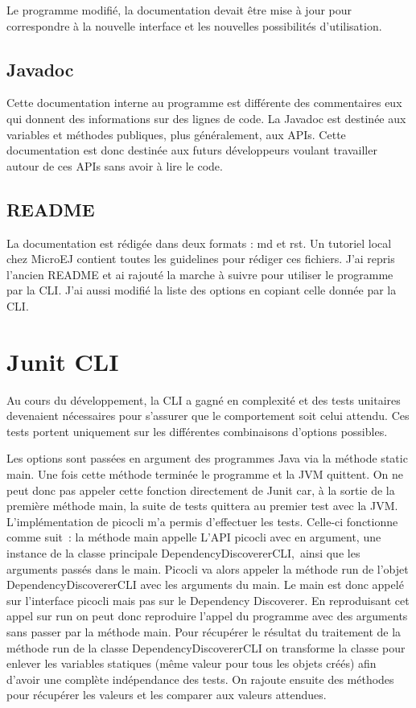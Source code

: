 \documentclass[french,a4paper,12pt]{report}
\begin{document}
Le programme modifié, la documentation devait être mise à jour pour correspondre à la nouvelle interface et les nouvelles possibilités d’utilisation.


\subsection{Javadoc}

Cette documentation interne au programme est différente des commentaires eux qui donnent des informations sur des lignes de code. La Javadoc est destinée aux variables et méthodes publiques, plus généralement, aux APIs. Cette documentation est donc destinée aux futurs développeurs voulant travailler autour de ces APIs sans avoir à lire le code.

\subsection{README}

La documentation est rédigée dans deux formats : md et rst. Un tutoriel local chez MicroEJ contient toutes les guidelines pour rédiger ces fichiers. J'ai repris l'ancien README et ai rajouté la marche à suivre pour utiliser le programme par la CLI. J'ai aussi modifié la liste des options en copiant celle donnée par la CLI. 

\section{Junit CLI}

Au cours du développement, la CLI a gagné en complexité et des tests unitaires devenaient nécessaires pour s’assurer que le comportement soit celui attendu. Ces tests portent uniquement sur les différentes combinaisons d’options possibles. 

Les options sont passées en argument des programmes Java via la méthode static main. Une fois cette méthode terminée le programme et la JVM quittent. On ne peut donc pas appeler cette fonction directement de Junit car, à la sortie de la première méthode main, la suite de tests quittera au premier test avec la JVM. 
L’implémentation de picocli m’a permis d’effectuer les tests. Celle-ci fonctionne comme suit : la méthode main appelle L’API picocli avec en argument, une instance de la classe principale DependencyDiscovererCLI, ainsi que les arguments passés dans le main.
Picocli va alors appeler la méthode run de l'objet DependencyDiscovererCLI avec les arguments du main. Le main est donc appelé sur l'interface picocli mais pas sur le Dependency Discoverer.
En reproduisant cet appel sur run on peut donc reproduire l’appel du programme avec des arguments sans passer par la méthode main.
Pour récupérer le résultat du traitement de la méthode run de la classe DependencyDiscovererCLI on transforme la classe pour enlever les variables statiques (même valeur pour tous les objets créés) afin d’avoir une complète indépendance des tests. On rajoute ensuite des méthodes pour récupérer les valeurs et les comparer aux valeurs attendues.
\end{document}
